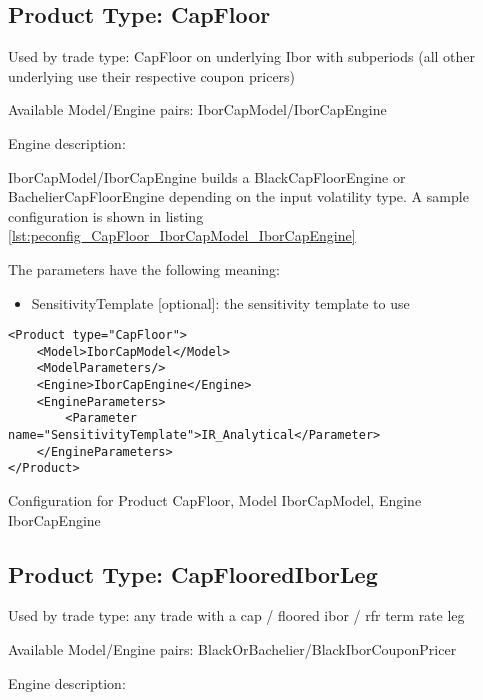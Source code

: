 \subsection{Product Type: CapFloor}

Used by trade type: CapFloor on underlying Ibor with subperiods (all other underlying use their respective coupon pricers)

Available Model/Engine pairs: IborCapModel/IborCapEngine

Engine description:

IborCapModel/IborCapEngine builds a BlackCapFloorEngine or BachelierCapFloorEngine depending on the input volatility
type. A sample configuration is shown in listing \ref{lst:peconfig_CapFloor_IborCapModel_IborCapEngine}

The parameters have the following meaning:

\begin{itemize}
\item SensitivityTemplate [optional]: the sensitivity template to use 
\end{itemize}

\begin{longlisting}
\begin{verbatim}
<Product type="CapFloor">
    <Model>IborCapModel</Model>
    <ModelParameters/>
    <Engine>IborCapEngine</Engine>
    <EngineParameters>
        <Parameter name="SensitivityTemplate">IR_Analytical</Parameter>
    </EngineParameters>
</Product>
\end{verbatim}
\caption{Configuration for Product CapFloor, Model IborCapModel, Engine IborCapEngine}
\label{lst:peconfig_CapFloor_IborCapModel_IborCapEngine}
\end{longlisting}

\subsection{Product Type: CapFlooredIborLeg}

Used by trade type: any trade with a cap / floored ibor / rfr term rate leg

Available Model/Engine pairs: BlackOrBachelier/BlackIborCouponPricer

Engine description:


